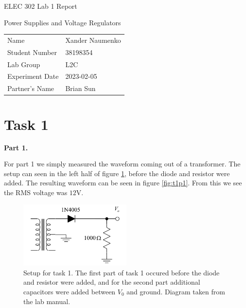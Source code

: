 \documentclass[letterpaper, reqno,11pt]{article}
\begin{document}


\begin{titlepage}
\centering


\Large ELEC 302 Lab 1 Report


\normalsize Power Supplies and Voltage Regulators


\begin{tabular}{ll}
Name & Xander Naumenko \\[2ex]
Student Number  & 38198354 \\[2ex]
Lab Group            & L2C \\[2ex]
Experiment Date            & 2023-02-05 \\[2ex]
Partner's Name &  Brian Sun
\end{tabular}



\end{titlepage}


\section{Task 1}

{\medskip\noindent\bf Part 1.} 

For part 1 we simply measured the waveform coming out of a transformer. The setup can seen in the left half of figure \ref{fig:t1}, before the diode and resistor were added. The resulting waveform can be seen in figure \ref{fig:t1p1}. From this we see the RMS voltage was $12$V.

\begin{figure}[htpb]
        \centering
        \includegraphics[width=0.5\textwidth]{t1}
        \caption{Setup for task 1. The first part of task 1 occured before the diode and resistor were added, and for the second part additional capacitors were added between $V_0$ and ground. Diagram taken from the lab manual.}
        \label{fig:t1}
\end{figure}
\end{document}
